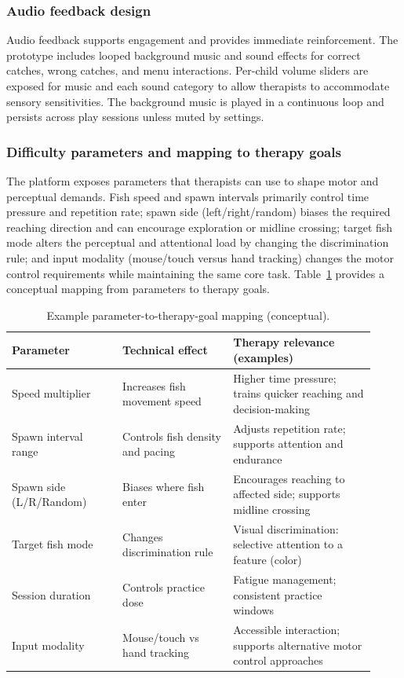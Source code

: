 \documentclass[12pt]{article}
\begin{document}
\subsubsection*{Audio feedback design}
Audio feedback supports engagement and provides immediate reinforcement. The prototype includes looped background music and sound effects for correct catches, wrong catches, and menu interactions. Per-child volume sliders are exposed for music and each sound category to allow therapists to accommodate sensory sensitivities. The background music is played in a continuous loop and persists across play sessions unless muted by settings.

\subsubsection*{Difficulty parameters and mapping to therapy goals}
The platform exposes parameters that therapists can use to shape motor and perceptual demands. Fish speed and spawn intervals primarily control time pressure and repetition rate; spawn side (left/right/random) biases the required reaching direction and can encourage exploration or midline crossing; target fish mode alters the perceptual and attentional load by changing the discrimination rule; and input modality (mouse/touch versus hand tracking) changes the motor control requirements while maintaining the same core task. Table~\ref{tab:param_mapping} provides a conceptual mapping from parameters to therapy goals.

\begin{table}[H]
\centering
\caption{Example parameter-to-therapy-goal mapping (conceptual).}
\label{tab:param_mapping}
\begin{tabular}{p{0.28\linewidth} p{0.28\linewidth} p{0.36\linewidth}}
\toprule
\textbf{Parameter} & \textbf{Technical effect} & \textbf{Therapy relevance (examples)} \\
\midrule
Speed multiplier & Increases fish movement speed & Higher time pressure; trains quicker reaching and decision-making \\
Spawn interval range & Controls fish density and pacing & Adjusts repetition rate; supports attention and endurance \\
Spawn side (L/R/Random) & Biases where fish enter & Encourages reaching to affected side; supports midline crossing \\
Target fish mode & Changes discrimination rule & Visual discrimination: selective attention to a feature (color) \\
Session duration & Controls practice dose & Fatigue management; consistent practice windows \\
Input modality & Mouse/touch vs hand tracking & Accessible interaction; supports alternative motor control approaches \\
\bottomrule
\end{tabular}
\end{table}
\end{document}
